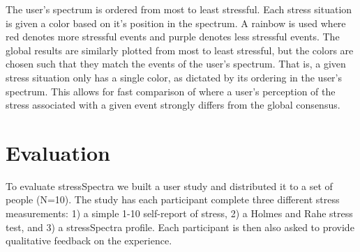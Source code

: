 \documentclass{sigchi}
\begin{document}
The user's spectrum is ordered from most to least stressful. Each stress situation is given a color based on it's position in the spectrum. A rainbow is used where red denotes more stressful events and purple denotes less stressful events. The global results are similarly plotted from most to least stressful, but the colors are chosen such that they match the events of the user's spectrum. That is, a given stress situation only has a single color, as dictated by its ordering in the user's spectrum. This allows for fast comparison of where a user's perception of the stress associated with a given event strongly differs from the global consensus. 

\section{Evaluation}
To evaluate stressSpectra we built a user study and distributed it to a set of people (N=10). The study has each participant complete three different stress measurements: 1) a simple 1-10 self-report of stress, 2) a Holmes and Rahe stress test, and 3) a stressSpectra profile. Each participant is then also asked to provide qualitative feedback on the experience. 
\end{document}
